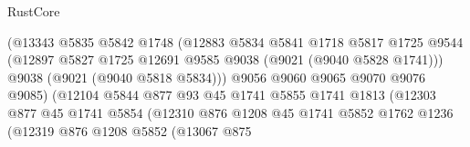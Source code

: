 \begin{lexlean}{RustCore}
\begin{coremodule}
                                      (@13343
                                        @5835
                                        @5842
                                        @1748
                                        (@12883
                                          @5834
                                          @5841
                                          @1718
                                          @5817
                                          @1725
                                          @9544
                                          (@12897
                                            @5827
                                            @1725
                                            @12691
                                            @9585
                                            @9038
                                            (@9021 (@9040 @5828 @1741)))
                                          @9038
                                          (@9021 (@9040 @5818 @5834)))
                                        @9056
                                        @9060
                                        @9065
                                        @9070
                                        @9076
                                        @9085)
                                      (@12104
                                        @5844
                                        @877
                                        @93
                                        @45
                                        @1741
                                        @5855
                                        @1741
                                        @1813
                                        (@12303
                                          @877
                                          @45
                                          @1741
                                          @5854
                                          (@12310
                                            @876
                                            @1208
                                            @45
                                            @1741
                                            @5852
                                            @1762
                                            @1236
                                            (@12319
                                              @876
                                              @1208
                                              @5852
                                              (@13067
                                                @875

\end{coremodule}
\end{lexlean}
